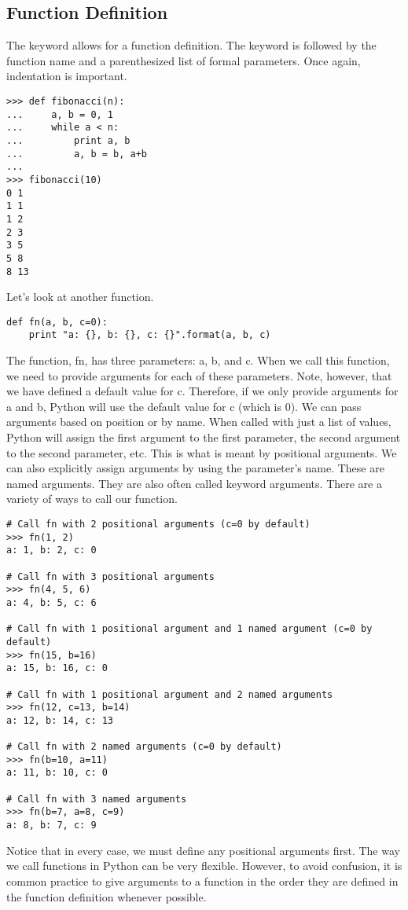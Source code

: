 \subsection*{Function Definition}
\begin{example}
The  keyword allows for a function definition. The keyword is followed by 
the function name and a parenthesized list of formal parameters.
Once again, indentation is important. 
\begin{lstlisting}
>>> def fibonacci(n):
...     a, b = 0, 1
...     while a < n:
...         print a, b
...         a, b = b, a+b
...         
>>> fibonacci(10)
0 1
1 1
1 2
2 3
3 5
5 8
8 13
\end{lstlisting}

Let's look at another function.
\begin{lstlisting}
def fn(a, b, c=0):
    print "a: {}, b: {}, c: {}".format(a, b, c)
\end{lstlisting}
The function, fn, has three parameters: a, b, and c.
When we call this function, we need to provide arguments for each of these parameters.
Note, however, that we have defined a default value for c.
Therefore, if we only provide arguments for a and b, Python will use the default value for c (which is 0).
We can pass arguments based on position or by name.
When called with just a list of values, Python will assign the first argument to the first parameter,
the second argument to the second parameter, etc.
This is what is meant by positional arguments.
We can also explicitly assign arguments by using the parameter's name.
These are named arguments.
They are also often called keyword arguments.
There are a variety of ways to call our function.
\begin{lstlisting}
# Call fn with 2 positional arguments (c=0 by default)
>>> fn(1, 2)
a: 1, b: 2, c: 0

# Call fn with 3 positional arguments
>>> fn(4, 5, 6)
a: 4, b: 5, c: 6

# Call fn with 1 positional argument and 1 named argument (c=0 by default)
>>> fn(15, b=16)
a: 15, b: 16, c: 0

# Call fn with 1 positional argument and 2 named arguments
>>> fn(12, c=13, b=14)
a: 12, b: 14, c: 13

# Call fn with 2 named arguments (c=0 by default)
>>> fn(b=10, a=11)
a: 11, b: 10, c: 0

# Call fn with 3 named arguments
>>> fn(b=7, a=8, c=9)
a: 8, b: 7, c: 9
\end{lstlisting}
Notice that in every case, we must define any positional arguments first.
The way we call functions in Python can be very flexible.
However, to avoid confusion, it is common practice to give arguments to a function in the order they are defined in the function definition whenever possible.


\end{example}
